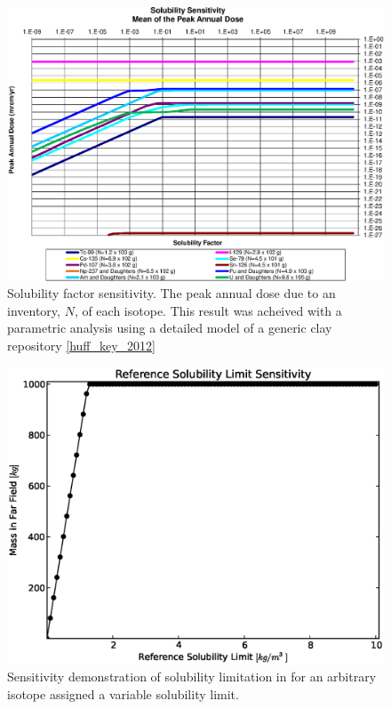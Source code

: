 \begin{figure}[ht]
\begin{center}
\includegraphics[width=0.7\linewidth]{./Solubility_Summary_SolFactor.eps}
\caption[Solubility factor sensitivity in GDSM Clay model]{Solubility factor sensitivity. The peak annual dose due to an inventory, $N$, of each isotope. This result was acheived with a parametric analysis using a detailed model of a generic clay repository \ref{huff_key_2012}}
\label{fig:SolSumFactor}
\end{center}
\end{figure}


\begin{figure}[htbp!]
\begin{center}
\includegraphics[width=0.7\linewidth]{./sol.eps}
\caption[Solubility Sensitivity in the Mixed Cell Model]{Sensitivity demonstration of solubility limitation in \Cyder for an arbitrary isotope assigned a variable solubility limit.}
\label{fig:sol_result}
\end{center}
\end{figure}
